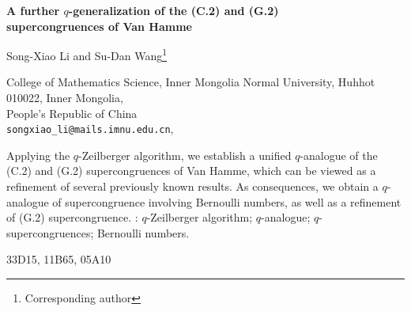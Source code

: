 \documentclass[12pt]{article}
\numberwithin{equation}{section}
\begin{document}
\begin{center}
{\Large\bf A further $q$-generalization of the (C.2) and (G.2)\\[6pt] 
supercongruences of Van Hamme}
\end{center}

\vskip 2mm \centerline{Song-Xiao Li and Su-Dan Wang\thanks{Corresponding author}}
\begin{center}

{College of Mathematics Science, Inner Mongolia Normal University, Huhhot 010022, Inner Mongolia,\\
 People's Republic of China\\
 {\tt songxiao\_li@mails.imnu.edu.cn},\hspace{0.5em}{\tt sdwang@imnu.edu.cn}}

\end{center}

\vskip 0.7cm  Applying the $q$-Zeilberger algorithm, we establish a unified $q$-analogue of the (C.2) and (G.2) supercongruences 
of Van Hamme, which can be viewed as a refinement of several previously known results. As consequences, we  obtain a $q$-analogue of supercongruence 
involving Bernoulli numbers, as well as a refinement of (G.2) supercongruence.
\vskip 3mm : $q$-Zeilberger algorithm; $q$-analogue; $q$-supercongruences; Bernoulli numbers.

\vskip 0.2cm  33D15, 11B65, 05A10
\end{document}
